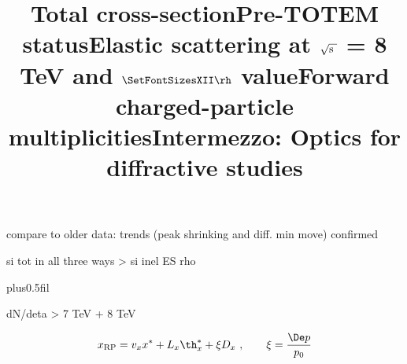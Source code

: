\> compare to older data: trends (peak shrinking and diff. min move) confirmed

\newpage %
\title{}

\> si tot in all three ways
\>> si inel
\> ES rho

\newpage %
\hbox{}
\vfil
\title{Total cross-section}

\vskip0pt plus0.5fil

\vfil

\newpage %
\title{Pre-TOTEM status}


\newpage %
\hbox{}
\vfil
\title{Elastic scattering at $\sqrt{\hbox{s }}$ = 8 TeV and $\SetFontSizesXII\rh$ value}



\newpage %
\hbox{}
\vfil
\title{Forward charged-particle multiplicities}


\newpage %
\title{}

\> dN/deta
\>> 7 TeV + 8 TeV

\newpage %
\title{Intermezzo: Optics for diffractive studies}
\vskip-8mm
$$x_{\rm RP} = v_x x^* + L_x \th_x^* + \xi D_x\ ,\qquad \xi = {\De p\over p_0}$$
\vskip-2mm

